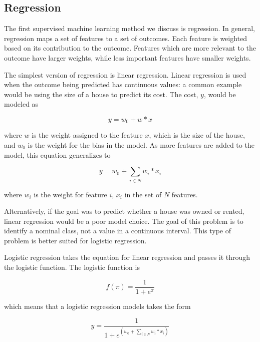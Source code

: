 \subsection{Regression}

The first supervised machine learning method we discuss is regression. In general, regression maps a set of features to a set of outcomes. Each feature is weighted based on its contribution to the outcome. Features which are more relevant to the outcome have larger weights, while less important features have smaller weights. 

The simplest version of regression is linear regression. Linear regression is used when the outcome being predicted has continuous values: a common example would be using the size of a house to predict its cost. The cost, $y$, would be modeled as

\begin{equation}
y = w_0 + w*x
\end{equation}

\noindent where $w$ is the weight assigned to the feature $x$, which is the size of the house, and $w_0$ is the weight for the bias in the model. As more features are added to the model, this equation generalizes to 

\begin{equation}
y = w_0 + \sum_{i \in N} w_i*x_i
\end{equation}

\noindent where $w_i$ is the weight for feature $i$, $x_i$ in the set of $N$ features. 

Alternatively, if the goal was to predict whether a house was owned or rented, linear regression would be a poor model choice. The goal of this problem is to identify a nominal class, not a value in a continuous interval. This type of problem is better suited for logistic regression.

Logistic regression takes the equation for linear regression and passes it through the logistic function. %
The logistic function is 

\begin{equation}
f(\pi) = \frac{1}{1+e^{\pi}}
\end{equation}

\noindent which means that a logistic regression models takes the form

\begin{equation}
y = \frac{1}{1+e^{(w_0 + \sum_{i \in N} w_i*x_i)}}
\end{equation}

